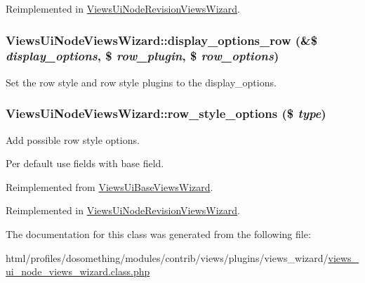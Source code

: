 Reimplemented in \hyperlink{classViewsUiNodeRevisionViewsWizard_ac51b61da9be3e950479313ffb4135546}{ViewsUiNodeRevisionViewsWizard}.\hypertarget{classViewsUiNodeViewsWizard_aa02d9cffaec4012fdd13ffb9659ed2f2}{
\subsubsection[{display\_\-options\_\-row}]{\setlength{\rightskip}{0pt plus 5cm}ViewsUiNodeViewsWizard::display\_\-options\_\-row (\&\$ {\em display\_\-options}, \/  \$ {\em row\_\-plugin}, \/  \$ {\em row\_\-options})}}
\label{classViewsUiNodeViewsWizard_aa02d9cffaec4012fdd13ffb9659ed2f2}
Set the row style and row style plugins to the display\_\-options. \hypertarget{classViewsUiNodeViewsWizard_acc49f93c07b0fdcacccc4c7d6d62d9ed}{
\subsubsection[{row\_\-style\_\-options}]{\setlength{\rightskip}{0pt plus 5cm}ViewsUiNodeViewsWizard::row\_\-style\_\-options (\$ {\em type})}}
\label{classViewsUiNodeViewsWizard_acc49f93c07b0fdcacccc4c7d6d62d9ed}
Add possible row style options.

Per default use fields with base field. 

Reimplemented from \hyperlink{classViewsUiBaseViewsWizard_af5c8d4b868a5bf71075c373af3a96252}{ViewsUiBaseViewsWizard}.

Reimplemented in \hyperlink{classViewsUiNodeRevisionViewsWizard_a920d30184506f8f5a9c8db643742b329}{ViewsUiNodeRevisionViewsWizard}.

The documentation for this class was generated from the following file:\begin{DoxyCompactItemize}
\item 
html/profiles/dosomething/modules/contrib/views/plugins/views\_\-wizard/\hyperlink{views__ui__node__views__wizard_8class_8php}{views\_\-ui\_\-node\_\-views\_\-wizard.class.php}\end{DoxyCompactItemize}
